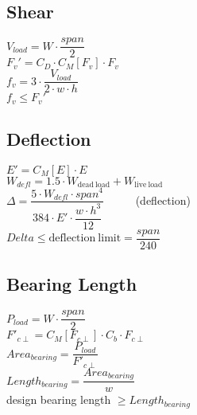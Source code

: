 \documentclass[12pt]{article}
\begin{document}
\subsection{Shear}

$V_{load} = W \cdot \dfrac{span}{2}$
\\[1.0ex]
$F_v' = C_D \cdot C_M[F_v] \cdot F_v$
\\[1.0ex]
$f_v = 3 \cdot \dfrac{V_{load}}{2 \cdot w \cdot h}$
\\[1.0ex]
$f_v \leq F_v'$

\newpage

\subsection{Deflection}

$E' = C_M[E] \cdot E$
\\[1.0ex]
$W_{defl} = 1.5 \cdot W_{\mathrm{dead~load}} + W_{\mathrm{live~load}}$
\\[1.0ex]
$\Delta = \dfrac{5 \cdot W_{defl} \cdot span^4}
                {384 \cdot E' \cdot \dfrac{w \cdot h^3}{12}}$
		~~~~~(deflection)
\\[1.0ex]
$Delta \leq {\mathrm{deflection~limit}} = \dfrac{span}{240}$

\subsection{Bearing Length}

$P_{load} = W \cdot \dfrac{span}{2}$
\\[1.0ex]
$F'_{c\perp} = C_M[F_{c\perp}] \cdot C_b \cdot F_{c\perp}$
\\[1.0ex]
$Area_{bearing} = \dfrac{P_{load}}{F'_{c\perp}}$
\\[1.0ex]
$Length_{bearing} = \dfrac{Area_{bearing}}{w}$
\\[1.0ex]
design bearing length $\geq Length_{bearing}$
\end{document}
